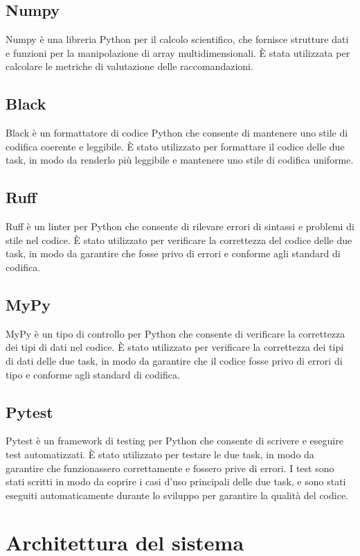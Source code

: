 \subsection{Numpy}
Numpy è una libreria Python per il calcolo scientifico, che fornisce strutture dati e funzioni per la manipolazione di array multidimensionali. È stata utilizzata per calcolare le metriche di valutazione delle raccomandazioni.

\subsection{Black}
Black è un formattatore di codice Python che consente di mantenere uno stile di codifica coerente e leggibile. È stato utilizzato per formattare il codice delle due task, in modo da renderlo più leggibile e mantenere uno stile di codifica uniforme.

\subsection{Ruff}
Ruff è un linter per Python che consente di rilevare errori di sintassi e problemi di stile nel codice. È stato utilizzato per verificare la correttezza del codice delle due task, in modo da garantire che fosse privo di errori e conforme agli standard di codifica.

\subsection{MyPy}
MyPy è un tipo di controllo per Python che consente di verificare la correttezza dei tipi di dati nel codice. È stato utilizzato per verificare la correttezza dei tipi di dati delle due task, in modo da garantire che il codice fosse privo di errori di tipo e conforme agli standard di codifica.

\subsection{Pytest}
Pytest è un framework di testing per Python che consente di scrivere e eseguire test automatizzati. È stato utilizzato per testare le due task, in modo da garantire che funzionassero correttamente e fossero prive di errori. I test sono stati scritti in modo da coprire i casi d'uso principali delle due task, e sono stati eseguiti automaticamente durante lo sviluppo per garantire la qualità del codice.


\section{Architettura del sistema}

